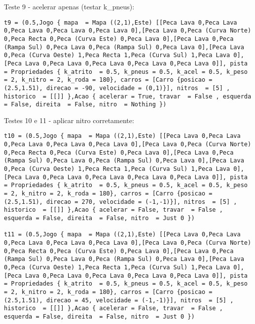 \documentclass[a4paper]{report}
\begin{document}
Teste 9 - acelerar apenas (testar k\_pneus):

\begin{lstlisting}
t9 = (0.5,Jogo { mapa  = Mapa ((2,1),Este) [[Peca Lava 0,Peca Lava 0,Peca Lava 0,Peca Lava 0,Peca Lava 0],[Peca Lava 0,Peca (Curva Norte) 0,Peca Recta 0,Peca (Curva Este) 0,Peca Lava 0],[Peca Lava 0,Peca (Rampa Sul) 0,Peca Lava 0,Peca (Rampa Sul) 0,Peca Lava 0],[Peca Lava 0,Peca (Curva Oeste) 1,Peca Recta 1,Peca (Curva Sul) 1,Peca Lava 0],[Peca Lava 0,Peca Lava 0,Peca Lava 0,Peca Lava 0,Peca Lava 0]], pista = Propriedades { k_atrito  = 0.5, k_pneus = 0.5, k_acel = 0.5, k_peso = 2, k_nitro = 2, k_roda = 180}, carros = [Carro {posicao = (2.5,1.51), direcao = -90, velocidade = (0,1)}], nitros  = [5] , historico  = [[]] },Acao { acelerar = True, travar  = False , esquerda = False, direita  = False, nitro  = Nothing })
\end{lstlisting}

Testes 10 e 11 - aplicar nitro corretamente:

\begin{lstlisting}
t10 = (0.5,Jogo { mapa  = Mapa ((2,1),Este) [[Peca Lava 0,Peca Lava 0,Peca Lava 0,Peca Lava 0,Peca Lava 0],[Peca Lava 0,Peca (Curva Norte) 0,Peca Recta 0,Peca (Curva Este) 0,Peca Lava 0],[Peca Lava 0,Peca (Rampa Sul) 0,Peca Lava 0,Peca (Rampa Sul) 0,Peca Lava 0],[Peca Lava 0,Peca (Curva Oeste) 1,Peca Recta 1,Peca (Curva Sul) 1,Peca Lava 0],[Peca Lava 0,Peca Lava 0,Peca Lava 0,Peca Lava 0,Peca Lava 0]], pista = Propriedades { k_atrito  = 0.5, k_pneus = 0.5, k_acel = 0.5, k_peso = 2, k_nitro = 2, k_roda = 180}, carros = [Carro {posicao = (2.5,1.51), direcao = 270, velocidade = (-1,-1)}], nitros  = [5] , historico  = [[]] },Acao { acelerar = False, travar  = False , esquerda = False, direita  = False, nitro  = Just 0 })

t11 = (0.5,Jogo { mapa  = Mapa ((2,1),Este) [[Peca Lava 0,Peca Lava 0,Peca Lava 0,Peca Lava 0,Peca Lava 0],[Peca Lava 0,Peca (Curva Norte) 0,Peca Recta 0,Peca (Curva Este) 0,Peca Lava 0],[Peca Lava 0,Peca (Rampa Sul) 0,Peca Lava 0,Peca (Rampa Sul) 0,Peca Lava 0],[Peca Lava 0,Peca (Curva Oeste) 1,Peca Recta 1,Peca (Curva Sul) 1,Peca Lava 0],[Peca Lava 0,Peca Lava 0,Peca Lava 0,Peca Lava 0,Peca Lava 0]], pista = Propriedades { k_atrito  = 0.5, k_pneus = 0.5, k_acel = 0.5, k_peso = 2, k_nitro = 2, k_roda = 180}, carros = [Carro {posicao = (2.5,1.51), direcao = 45, velocidade = (-1,-1)}], nitros  = [5] , historico  = [[]] },Acao { acelerar = False, travar  = False , esquerda = False, direita  = False, nitro  = Just 0 })
\end{lstlisting}
\end{document}
